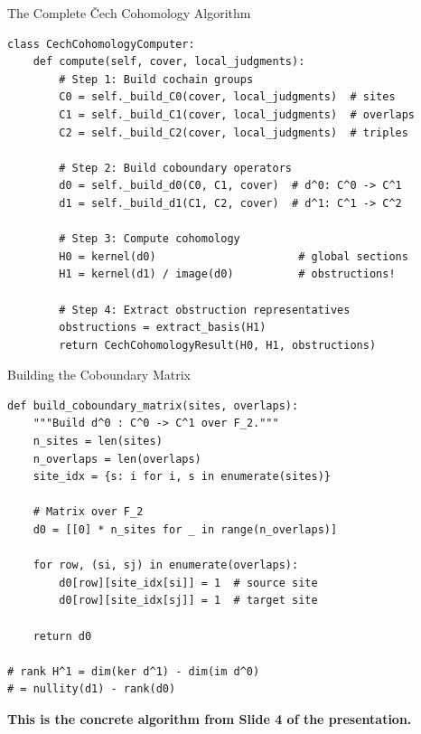 \documentclass[aspectratio=169,10pt]{beamer}
\begin{document}
\begin{frame}[fragile]{The Complete \v{C}ech Cohomology Algorithm}
\begin{lstlisting}
class CechCohomologyComputer:
    def compute(self, cover, local_judgments):
        # Step 1: Build cochain groups
        C0 = self._build_C0(cover, local_judgments)  # sites
        C1 = self._build_C1(cover, local_judgments)  # overlaps
        C2 = self._build_C2(cover, local_judgments)  # triples

        # Step 2: Build coboundary operators
        d0 = self._build_d0(C0, C1, cover)  # d^0: C^0 -> C^1
        d1 = self._build_d1(C1, C2, cover)  # d^1: C^1 -> C^2

        # Step 3: Compute cohomology
        H0 = kernel(d0)                      # global sections
        H1 = kernel(d1) / image(d0)          # obstructions!

        # Step 4: Extract obstruction representatives
        obstructions = extract_basis(H1)
        return CechCohomologyResult(H0, H1, obstructions)
\end{lstlisting}
\end{frame}

\begin{frame}[fragile]{Building the Coboundary Matrix}
\begin{lstlisting}
def build_coboundary_matrix(sites, overlaps):
    """Build d^0 : C^0 -> C^1 over F_2."""
    n_sites = len(sites)
    n_overlaps = len(overlaps)
    site_idx = {s: i for i, s in enumerate(sites)}
    
    # Matrix over F_2
    d0 = [[0] * n_sites for _ in range(n_overlaps)]
    
    for row, (si, sj) in enumerate(overlaps):
        d0[row][site_idx[si]] = 1  # source site
        d0[row][site_idx[sj]] = 1  # target site
    
    return d0

# rank H^1 = dim(ker d^1) - dim(im d^0)
# = nullity(d1) - rank(d0)
\end{lstlisting}

\textbf{This is the concrete algorithm from Slide 4 of the presentation.}
\end{frame}
\end{document}
